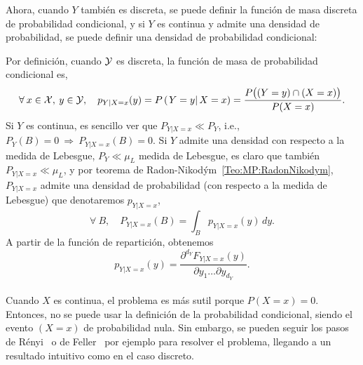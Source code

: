 Ahora, cuando $Y$  tambi\'en es discreta, se puede definir  la funci\'on de masa
discreta de probabilidad condicional, y si $Y$ es continua y admite una densidad
de probabilidad, se puede definir una densidad de probabilidad condicional:
%
\begin{definicion}
\label{Def:MP:ReparticionCondicionalDiscreta}
%
  Por  definici\'on,  cuando  $\mathcal{Y}$  es   discreta,  la  funci\'on  de  masa  de
  probabilidad condicional  es,
  \[
  \forall \: x \in \mathcal{X}, \: y \in \mathcal{Y}, \quad p_{Y|X=x}(y) = P\left( \left. Y = y \right|
  X  =  x \right)  =  \frac{P\big(  (Y  = y)  \cap  (X =  x) \big)}{P(X = x)}.
  \]
  Si $Y$ es continua, es sencillo ver que $P_{Y|X=x} \ll P_Y$, i.e., $P_Y(B) = 0
  \: \Rightarrow \: P_{Y|X=x}(B) = 0$.   Si $Y$ admite una densidad con respecto
  a la  medida de  Lebesgue, $P_Y \ll  \mu_L$ medida  de Lebesgue, es  claro que
  tambi\'en     $P_{Y|X=x}     \ll      \mu_L$,     y     por     teorema     de
  Radon-Nikod\'ym~\ref{Teo:MP:RadonNikodym}, $P_{Y|X=x}$  admite una densidad de
  probabilidad  (con   respecto  a  la  medida  de   Lebesgue)  que  denotaremos
  $p_{Y|X=x}$,
  \[
  \forall \: B, \quad P_{Y|X=x}(B) = \int_B p_{Y|X=x}(y) \, dy.
  \]
  A partir de la funci\'on de repartici\'on, obtenemos
  \[
  p_{Y|X=x}(y) = \frac{\partial^{d_Y} F_{Y|X=x}(y)}{\partial y_1 \ldots \partial
    y_{d_Y}}.
  \]
\end{definicion}



\paragraph{}
Cuando  $X$  es   continua,  el  problema  es  m\'as   sutil  porque  $P(X=x)  =
0$. Entonces, no  se puede usar la definici\'on  de la probabilidad condicional,
siendo el  evento $(X=x)$ de probabilidad  nula.  Sin embargo,  se pueden seguir
los  pasos de R\'enyi~\cite[Cap.~5]{Ren}  o de  Feller~\cite[Cap.~10]{Fel71} por
ejemplo para resolver el problema, llegando  a un
resultado intuitivo como en el caso discreto.

